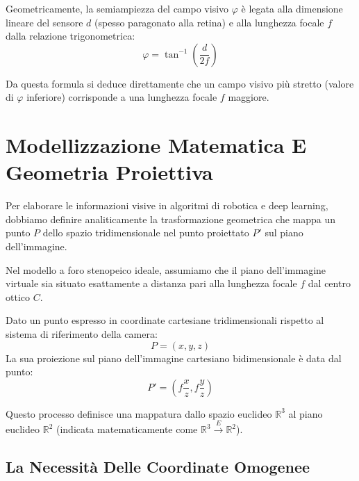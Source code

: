 ﻿\documentclass[11pt, a4paper]{article}
\begin{document}

Geometricamente, la semiampiezza del campo visivo $\varphi$ è legata alla dimensione lineare del sensore $d$ (spesso paragonato alla retina) e alla lunghezza focale $f$ dalla relazione trigonometrica:
\begin{equation}
    \boxed{\varphi = \tan^{-1}\left(\frac{d}{2f}\right)}
\end{equation}

Da questa formula si deduce direttamente che un campo visivo più stretto (valore di $\varphi$ inferiore) corrisponde a una lunghezza focale $f$ maggiore.

\newpage

\section{Modellizzazione Matematica E Geometria Proiettiva}

Per elaborare le informazioni visive in algoritmi di robotica e deep learning, dobbiamo definire analiticamente la trasformazione geometrica che mappa un punto $P$ dello spazio tridimensionale nel punto proiettato $P'$ sul piano dell'immagine.


Nel modello a foro stenopeico ideale, assumiamo che il piano dell'immagine virtuale sia situato esattamente a distanza pari alla lunghezza focale $f$ dal centro ottico $C$.

Dato un punto espresso in coordinate cartesiane tridimensionali rispetto al sistema di riferimento della camera:
\[
P = (x, y, z)
\]
La sua proiezione sul piano dell'immagine cartesiano bidimensionale è data dal punto:
\begin{equation}
    P' = \left(f\frac{x}{z}, f\frac{y}{z}\right)
\end{equation}

Questo processo definisce una mappatura dallo spazio euclideo $\mathbb{R}^3$ al piano euclideo $\mathbb{R}^2$ (indicata matematicamente come $\mathbb{R}^3 \overset{E}{\rightarrow} \mathbb{R}^2$).



\subsection{La Necessità Delle Coordinate Omogenee}
\end{document}
